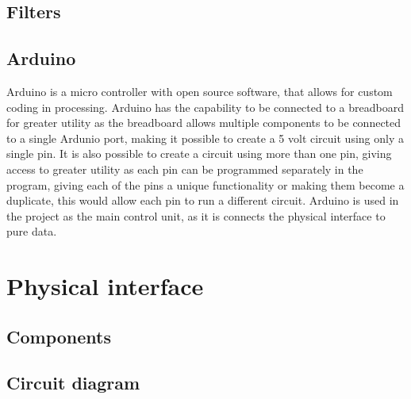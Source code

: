 	\subsection{Filters}\label{sub:filters}
	
	\subsection{Arduino}\label{sub:arduino}
	Arduino is a micro controller with open source software, that allows for custom coding in processing. Arduino has the capability to be connected to a breadboard for greater utility as the breadboard allows multiple components to be connected to a single Ardunio port, making it possible to create a 5 volt circuit using only a single pin. It is also possible to create a circuit using more than one pin, giving access to greater utility as each pin can be programmed separately in the program, giving each of the pins a unique functionality or making them become a duplicate, this would allow each pin to run a different circuit.
	Arduino is used in the project as the main control unit, as it is connects the physical interface to pure data. 
	
\section{Physical interface}\label{sec:physicalinterface}
	\subsection{Components}\label{sub:components}
	
	\subsection{Circuit diagram}\label{sub:circuitdiagram}